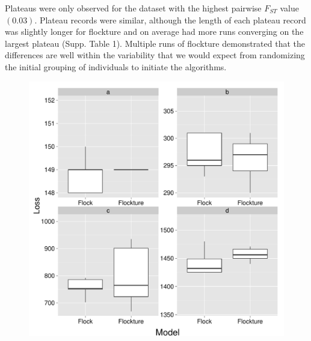Plateaus were only observed for the dataset 
with the highest pairwise $F_{ST}$ value $(0.03)$. Plateau records were similar, although 
the length of each plateau record was slightly longer for {\sc flockture} and on average had more runs converging on
the largest plateau (Supp. Table 1). Multiple runs of {\sc flockture} demonstrated that the differences are well within the
variability that we would expect from randomizing the initial grouping of individuals to 
initiate the algorithms.

\begin{figure}
\centering
\begin{minipage}{.45\textwidth}
  \centering
  \includegraphics[width=.9\linewidth]{images/Figures-Pat/FlockvFlocktureLoss.pdf}
  \label{fig:FvFloss}
\end{minipage}%
\hfill
\begin{minipage}{.45\textwidth}
  \centering

\end{minipage}
\end{figure}
